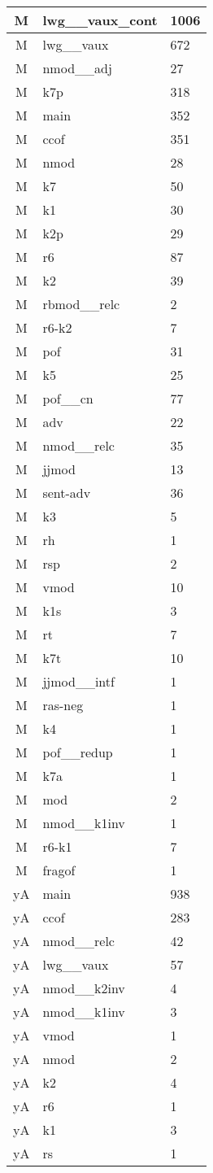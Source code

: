 \documentclass[a4 paper]{article}
\begin{document}
\begin{longtable}{cp{}p{}}
M & lwg\_\_vaux\_cont & 1006\\ \midrule M & lwg\_\_vaux & 672\\ \midrule M & nmod\_\_adj & 27\\ \midrule M & k7p & 318\\ \midrule M & main & 352\\ \midrule M & ccof & 351\\ \midrule M & nmod & 28\\ \midrule M & k7 & 50\\ \midrule M & k1 & 30\\ \midrule M & k2p & 29\\ \midrule M & r6 & 87\\ \midrule M & k2 & 39\\ \midrule M & rbmod\_\_relc & 2\\ \midrule M & r6-k2 & 7\\ \midrule M & pof & 31\\ \midrule M & k5 & 25\\ \midrule M & pof\_\_cn & 77\\ \midrule M & adv & 22\\ \midrule M & nmod\_\_relc & 35\\ \midrule M & jjmod & 13\\ \midrule M & sent-adv & 36\\ \midrule M & k3 & 5\\ \midrule M & rh & 1\\ \midrule M & rsp & 2\\ \midrule M & vmod & 10\\ \midrule M & k1s & 3\\ \midrule M & rt & 7\\ \midrule M & k7t & 10\\ \midrule M & jjmod\_\_intf & 1\\ \midrule M & ras-neg & 1\\ \midrule M & k4 & 1\\ \midrule M & pof\_\_redup & 1\\ \midrule M & k7a & 1\\ \midrule M & mod & 2\\ \midrule M & nmod\_\_k1inv & 1\\ \midrule M & r6-k1 & 7\\ \midrule M & fragof & 1\\ \midrule 
yA & main & 938\\ \midrule yA & ccof & 283\\ \midrule yA & nmod\_\_relc & 42\\ \midrule yA & lwg\_\_vaux & 57\\ \midrule yA & nmod\_\_k2inv & 4\\ \midrule yA & nmod\_\_k1inv & 3\\ \midrule yA & vmod & 1\\ \midrule yA & nmod & 2\\ \midrule yA & k2 & 4\\ \midrule yA & r6 & 1\\ \midrule yA & k1 & 3\\ \midrule yA & rs & 1\\ \midrule 

\end{longtable}
\end{document}

